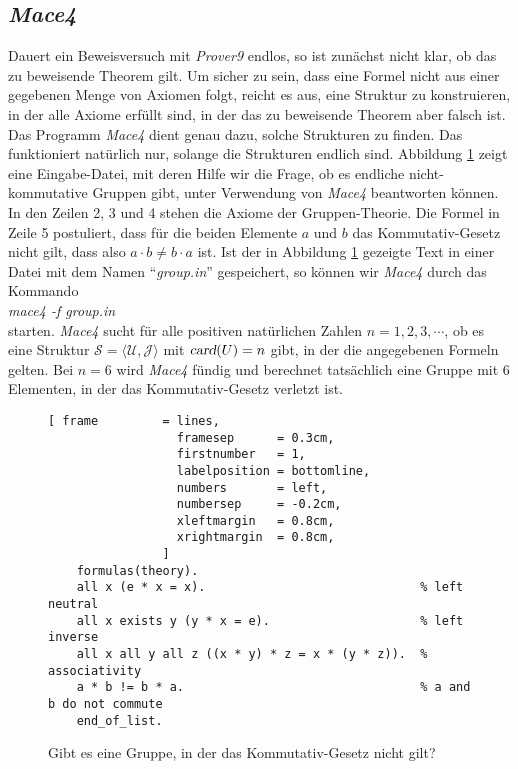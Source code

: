 \subsection{\textsl{Mace4} }
Dauert ein Beweisversuch  mit \textsl{Prover9} endlos, so ist zunächst nicht klar, ob das zu beweisende
Theorem gilt.  Um sicher zu sein, 
dass eine Formel nicht aus einer gegebenen Menge von Axiomen folgt, reicht es aus, eine Struktur zu
konstruieren, in der alle Axiome erfüllt sind, in der das zu beweisende Theorem aber falsch ist.
Das Programm \textsl{Mace4} dient genau dazu, solche Strukturen zu finden.  Das funktioniert natürlich nur,
solange die Strukturen endlich sind.  Abbildung \ref{fig:group.in} zeigt eine Eingabe-Datei, mit deren Hilfe
wir die Frage, ob es endliche nicht-kommutative Gruppen gibt, unter Verwendung von \textsl{Mace4} beantworten
können.  In den Zeilen 2, 3 und 4 stehen die Axiome der Gruppen-Theorie.  Die Formel in Zeile 5 postuliert,
dass für die beiden Elemente $a$ und $b$ das Kommutativ-Gesetz nicht gilt, dass also $a \cdot b \not= b \cdot
a$ ist.  Ist der in 
Abbildung \ref{fig:group.in} gezeigte Text in einer Datei mit dem Namen ``\textsl{group.in}'' gespeichert, so
können wir \textsl{Mace4} durch das Kommando
\\[0.2cm]
\hspace*{1.3cm}
\textsl{mace4 -f group.in}
\\[0.2cm]
starten.  \textsl{Mace4} sucht für alle positiven natürlichen  Zahlen $n=1,2,3,\cdots$, ob es eine Struktur 
$\mathcal{S} = \langle \mathcal{U}, \mathcal{J} \rangle$ mit $\textsl{card}(U) = n$ gibt, in der die
angegebenen Formeln gelten.  Bei $n=6$ wird \textsl{Mace4} fündig und berechnet tatsächlich eine Gruppe mit 6
Elementen, in der das Kommutativ-Gesetz verletzt ist.

\begin{figure}[!ht]
\centering
\begin{Verbatim}[ frame         = lines, 
                  framesep      = 0.3cm, 
                  firstnumber   = 1,
                  labelposition = bottomline,
                  numbers       = left,
                  numbersep     = -0.2cm,
                  xleftmargin   = 0.8cm,
                  xrightmargin  = 0.8cm,
                ]
    formulas(theory).
    all x (e * x = x).                              % left neutral
    all x exists y (y * x = e).                     % left inverse
    all x all y all z ((x * y) * z = x * (y * z)).  % associativity
    a * b != b * a.                                 % a and b do not commute
    end_of_list.
\end{Verbatim}
\vspace*{-0.3cm}
\caption{Gibt es eine Gruppe, in der das Kommutativ-Gesetz nicht gilt?}
\label{fig:group.in}
\end{figure}


